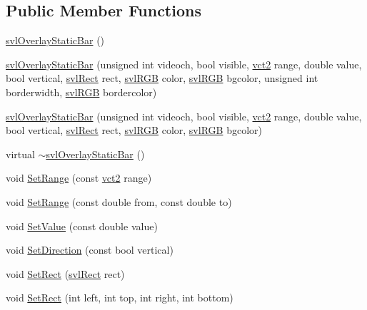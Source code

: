 \subsection*{Public Member Functions}
\begin{DoxyCompactItemize}
\item 
\hyperlink{classsvl_overlay_static_bar_a7e00d33b90509cb9e1f31e1b9750248e}{svl\-Overlay\-Static\-Bar} ()
\item 
\hyperlink{classsvl_overlay_static_bar_ac0e1d9e708f1d70467c823edf19b41a3}{svl\-Overlay\-Static\-Bar} (unsigned int videoch, bool visible, \hyperlink{vct_fixed_size_vector_types_8h_a88481ac3c794867ba5e4e92624f0d958}{vct2} range, double value, bool vertical, \hyperlink{structsvl_rect}{svl\-Rect} rect, \hyperlink{structsvl_r_g_b}{svl\-R\-G\-B} color, \hyperlink{structsvl_r_g_b}{svl\-R\-G\-B} bgcolor, unsigned int borderwidth, \hyperlink{structsvl_r_g_b}{svl\-R\-G\-B} bordercolor)
\item 
\hyperlink{classsvl_overlay_static_bar_a55929777b7011f41bf6c11db97d0d2bf}{svl\-Overlay\-Static\-Bar} (unsigned int videoch, bool visible, \hyperlink{vct_fixed_size_vector_types_8h_a88481ac3c794867ba5e4e92624f0d958}{vct2} range, double value, bool vertical, \hyperlink{structsvl_rect}{svl\-Rect} rect, \hyperlink{structsvl_r_g_b}{svl\-R\-G\-B} color, \hyperlink{structsvl_r_g_b}{svl\-R\-G\-B} bgcolor)
\item 
virtual \hyperlink{classsvl_overlay_static_bar_a87aeb5d0550c756213e8041bf43690e9}{$\sim$svl\-Overlay\-Static\-Bar} ()
\item 
void \hyperlink{classsvl_overlay_static_bar_a34bf99f8a0ed100fa44ea31ec2e0101f}{Set\-Range} (const \hyperlink{vct_fixed_size_vector_types_8h_a88481ac3c794867ba5e4e92624f0d958}{vct2} range)
\item 
void \hyperlink{classsvl_overlay_static_bar_a8bcc9dd8787c5157d6e64b72f61dbf52}{Set\-Range} (const double from, const double to)
\item 
void \hyperlink{classsvl_overlay_static_bar_a7581da9a4edb37aceedc589400003f4d}{Set\-Value} (const double value)
\item 
void \hyperlink{classsvl_overlay_static_bar_ada501fb04b1874d1a2275bfbd669d528}{Set\-Direction} (const bool vertical)
\item 
void \hyperlink{classsvl_overlay_static_bar_a1a2c96ca85b7ff468c8ed01d4fabeb01}{Set\-Rect} (\hyperlink{structsvl_rect}{svl\-Rect} rect)
\item 
void \hyperlink{classsvl_overlay_static_bar_acaf767fba295ad83efaafcb7a888c92c}{Set\-Rect} (int left, int top, int right, int bottom)

\end{DoxyCompactItemize}
